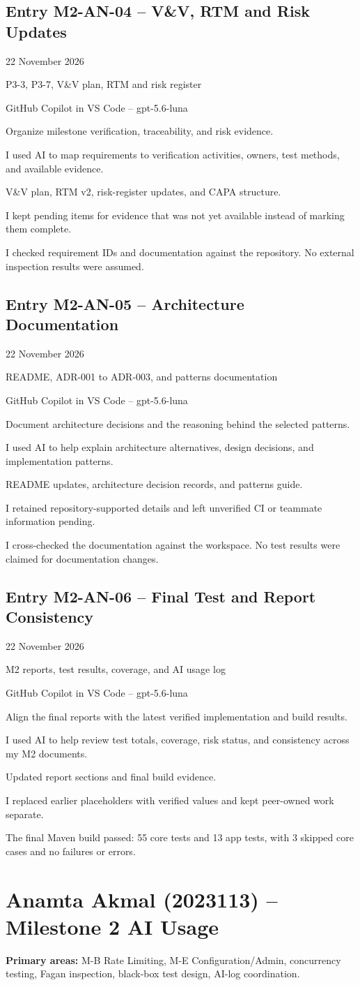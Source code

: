 \documentclass[11pt,a4paper]{article}
\newcommand{\ailogentry}[9]{
\subsection*{#1}
\begin{description}[leftmargin=3.2cm,style=nextline,font=\bfseries]
\item[Date] #2
\item[Module] #3
\item[AI Tool] #4
\item[Purpose] #5
\item[Activity] #6
\item[Used] #7
\item[Changes] #8
\item[Verification] #9
\end{description}
}
\begin{document}
\ailogentry
{Entry M2-AN-04 -- V\&V, RTM and Risk Updates}
{22 November 2026}
{P3-3, P3-7, V\&V plan, RTM and risk register}
{GitHub Copilot in VS Code -- gpt-5.6-luna}
{Organize milestone verification, traceability, and risk evidence.}
{I used AI to map requirements to verification activities, owners, test methods, and available evidence.}
{V\&V plan, RTM v2, risk-register updates, and CAPA structure.}
{I kept pending items for evidence that was not yet available instead of marking them complete.}
{I checked requirement IDs and documentation against the repository. No external inspection results were assumed.}

\ailogentry
{Entry M2-AN-05 -- Architecture Documentation}
{22 November 2026}
{README, ADR-001 to ADR-003, and patterns documentation}
{GitHub Copilot in VS Code -- gpt-5.6-luna}
{Document architecture decisions and the reasoning behind the selected patterns.}
{I used AI to help explain architecture alternatives, design decisions, and implementation patterns.}
{README updates, architecture decision records, and patterns guide.}
{I retained repository-supported details and left unverified CI or teammate information pending.}
{I cross-checked the documentation against the workspace. No test results were claimed for documentation changes.}

\ailogentry
{Entry M2-AN-06 -- Final Test and Report Consistency}
{22 November 2026}
{M2 reports, test results, coverage, and AI usage log}
{GitHub Copilot in VS Code -- gpt-5.6-luna}
{Align the final reports with the latest verified implementation and build results.}
{I used AI to help review test totals, coverage, risk status, and consistency across my M2 documents.}
{Updated report sections and final build evidence.}
{I replaced earlier placeholders with verified values and kept peer-owned work separate.}
{The final Maven build passed: 55 core tests and 13 app tests, with 3 skipped core cases and no failures or errors.}

\clearpage


\section{Anamta Akmal (2023113) -- Milestone 2 AI Usage}

\textbf{Primary areas:} M-B Rate Limiting, M-E Configuration/Admin,
concurrency testing, Fagan inspection, black-box test design, AI-log coordination.
\end{document}
